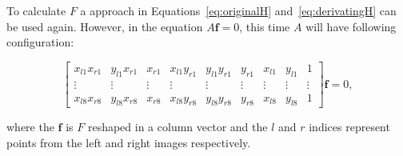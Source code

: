 \documentclass[12pt]{article}
\begin{document}
To calculate $F$ a approach in Equations~\ref{eq:originalH} and~\ref{eq:derivatingH} can be used again.
However, in the equation $A\mathbf{f} = 0$, this time $A$ will have following configuration:

\begin{equation}
\begin{bmatrix}
x_{l1} x_{r1} & y_{l1} x_{r1} & x_{r1} & x_{l1} y_{r1} & y_{l1} y_{r1} & y_{r1} & x_{l1} & y_{l1} & 1 \\
\vdots & \vdots & \vdots & \vdots & \vdots & \vdots & \vdots & \vdots & \vdots  \\
x_{l8} x_{r8} & y_{l8} x_{r8} & x_{r8} & x_{l8} y_{r8} & y_{l8} y_{r8} & y_{r8} & x_{l8} & y_{l8} & 1 
\end{bmatrix}
\mathbf{f}
= 0,
\end{equation}

where the $\mathbf{f}$ is $F$ reshaped in a column vector and the $l$ and $r$ indices represent points from the left and right images respectively. 
\end{document}
